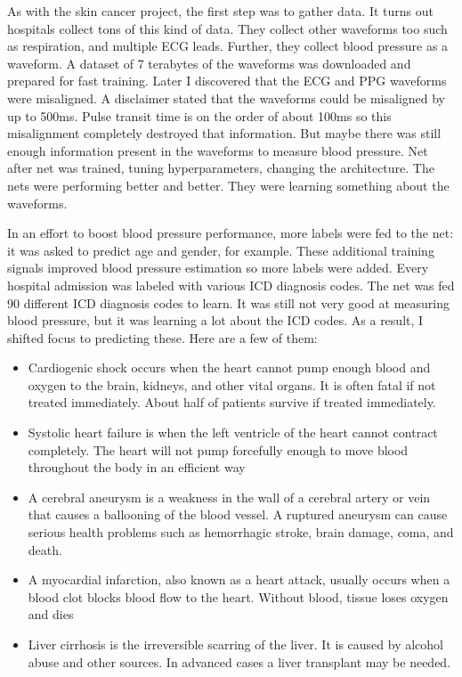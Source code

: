 As with the skin cancer project, the first step was to gather data.  It turns out hospitals collect tons of this kind of data.  They collect other waveforms too such as respiration, and multiple ECG leads.  Further, they collect blood pressure as a waveform.  A dataset of 7 terabytes of the waveforms was downloaded and prepared for fast training.  Later I discovered that the ECG and PPG waveforms were misaligned.  A disclaimer stated that the waveforms could be misaligned by up to 500ms. Pulse transit time is on the order of about 100ms so this misalignment completely destroyed that information.  But maybe there was still enough information present in the waveforms to measure blood pressure.  Net after net was trained, tuning hyperparameters, changing the architecture.  The nets were performing better and better.  They were learning something about the waveforms.

In an effort to boost blood pressure performance, more labels were fed to the net: it was asked to predict age and gender, for example.  These additional training signals improved blood pressure estimation so more labels were added.  Every hospital admission was labeled with various ICD diagnosis codes.  The net was fed 90 different ICD diagnosis codes to learn.  It was still not very good at measuring blood pressure, but it was learning a lot about the ICD codes.  As a result, I shifted focus to predicting these.  Here are a few of them:

\begin{itemize}
    \item Cardiogenic shock occurs when the heart cannot pump enough blood and oxygen to the brain, kidneys, and other vital organs.  It is often fatal if not treated immediately.  About half of patients survive if treated immediately.
    \item Systolic heart failure is when the left ventricle of the heart cannot contract completely.  The heart will not pump forcefully enough to move blood throughout the body in an efficient way
    \item A cerebral aneurysm is a weakness in the wall of a cerebral artery or vein that causes a ballooning of the blood vessel.  A ruptured aneurysm can cause serious health problems such as hemorrhagic stroke, brain damage, coma, and death.
    \item A myocardial infarction, also known as a heart attack, usually occurs when a blood clot blocks blood flow to the heart.  Without blood, tissue loses oxygen and dies
    \item Liver cirrhosis is the irreversible scarring of the liver.  It is caused by alcohol abuse and other sources.  In advanced cases a liver transplant may be needed.
\end{itemize}


